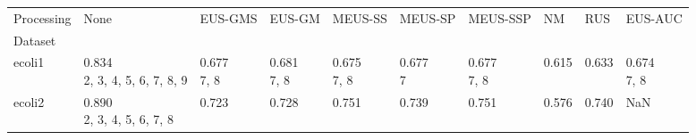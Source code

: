 \begin{tabular}{llllllllll}
\toprule
Processing &                                                     None &                                      EUS-GMS &                                    EUS-GM &                                MEUS-SS &                                         MEUS-SP &                                     MEUS-SSP &                                 NM &                                          RUS &                                EUS-AUC \\
Dataset                &                                                          &                                              &                                           &                                        &                                                 &                                              &                                    &                                              &                                        \\
\midrule
ecoli1                 &  \makecell{0.834 \\ \scriptsize{2, 3, 4, 5, 6, 7, 8, 9}} &        \makecell{0.677 \\ \scriptsize{7, 8}} &     \makecell{0.681 \\ \scriptsize{7, 8}} &  \makecell{0.675 \\ \scriptsize{7, 8}} &              \makecell{0.677 \\ \scriptsize{7}} &        \makecell{0.677 \\ \scriptsize{7, 8}} &  \makecell{0.615 \\ \scriptsize{}} &            \makecell{0.633 \\ \scriptsize{}} &  \makecell{0.674 \\ \scriptsize{7, 8}} \\
ecoli2                 &     \makecell{0.890 \\ \scriptsize{2, 3, 4, 5, 6, 7, 8}} &            \makecell{0.723 \\ \scriptsize{}} &         \makecell{0.728 \\ \scriptsize{}} &      \makecell{0.751 \\ \scriptsize{}} &               \makecell{0.739 \\ \scriptsize{}} &            \makecell{0.751 \\ \scriptsize{}} &  \makecell{0.576 \\ \scriptsize{}} &            \makecell{0.740 \\ \scriptsize{}} &                                    NaN \\

\end{tabular}
